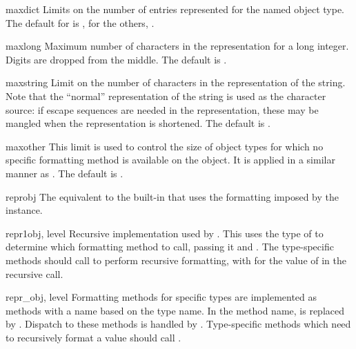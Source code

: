 \begin{memberdesc}{maxdict}
  Limits on the number of entries represented for the named object
  type.  The default for  is , for the others, 
  .
\end{memberdesc}

\begin{memberdesc}{maxlong}
  Maximum number of characters in the representation for a long
  integer.  Digits are dropped from the middle.  The default is
  .
\end{memberdesc}

\begin{memberdesc}{maxstring}
  Limit on the number of characters in the representation of the
  string.  Note that the ``normal'' representation of the string is
  used as the character source: if escape sequences are needed in the
  representation, these may be mangled when the representation is
  shortened.  The default is .
\end{memberdesc}

\begin{memberdesc}{maxother}
  This limit is used to control the size of object types for which no
  specific formatting method is available on the  object.
  It is applied in a similar manner as .  The
  default is .
\end{memberdesc}

\begin{methoddesc}{repr}{obj}
  The equivalent to the built-in  that uses the
  formatting imposed by the instance.
\end{methoddesc}

\begin{methoddesc}{repr1}{obj, level}
  Recursive implementation used by .  This uses the
  type of  to determine which formatting method to call,
  passing it  and .  The type-specific methods
  should call  to perform recursive formatting, with
   for the value of  in the recursive 
  call.
\end{methoddesc}

\begin{methoddescni}{repr_}{obj, level}
  Formatting methods for specific types are implemented as methods
  with a name based on the type name.  In the method name, 
  is replaced by
  .
  Dispatch to these methods is handled by .
  Type-specific methods which need to recursively format a value
  should call .
\end{methoddescni}


